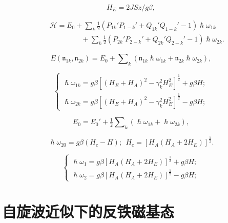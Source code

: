\documentclass{article}
\begin{document}
\begin{equation*}
H_E=2JSz/g\beta,
\end{equation*}

\begin{eqnarray} \label{eq:94}
&&\mathcal{H}=E_0+\sum\nolimits_k\tfrac{1}{2}(P_{1k}'P_{1-k}'+Q_{1k}'Q_{1-k}'-1)\hslash\omega_{1k}\nonumber\\
&&~~~~~~~~~~~~~~~~~~~~+\sum\nolimits_k\tfrac{1}{2}(P_{2k}'P_{2-k}'+Q_{2k}'Q_{2-k}'-1)\hslash\omega_{2k}.
\end{eqnarray}

\begin{equation} \label{eq:95}
E(\mathfrak{n}_{1k},\mathfrak{n}_{2k})=E_0+\sum\nolimits_k(\mathfrak{n}_{1k}\hslash\omega_{1k}+\mathfrak{n}_{2k}\hslash\omega_{2k}),
\end{equation}

\begin{equation} \label{eq:96}
\left\{
\begin{array}{l}
\hslash\omega_{1k}=g\beta[(H_E+H_A)^2-\gamma_k^2H_E^2]^\frac{1}{2}+g\beta H;\\
\hslash\omega_{2k}=g\beta[(H_E+H_A)^2-\gamma_k^2H_E^2]^\frac{1}{2}-g\beta H;
\end{array}
\right.
\end{equation}

\begin{equation} \label{eq:97}
E_0=E_0'+\tfrac{1}{2}\sum\nolimits_k(\hslash\omega_{1k}+\hslash\omega_{2k}),
\end{equation}

\begin{equation} \label{eq:98}
\hslash\omega_{20}=g\beta(H_c-H);~~H_c=[H_A(H_A+2H_E)]^\frac{1}{2}.
\end{equation}

\begin{equation} \label{eq:99}
\left\{
\begin{array}{l}
\hslash\omega_1=g\beta[H_A(H_A+2H_E)]^\frac{1}{2}+g\beta H;\\
\hslash\omega_2=g\beta[H_A(H_A+2H_E)]^\frac{1}{2}-g\beta H;
\end{array}
\right.
\end{equation}



\section{自旋波近似下的反铁磁基态} \label{sec:8}
\end{document}
